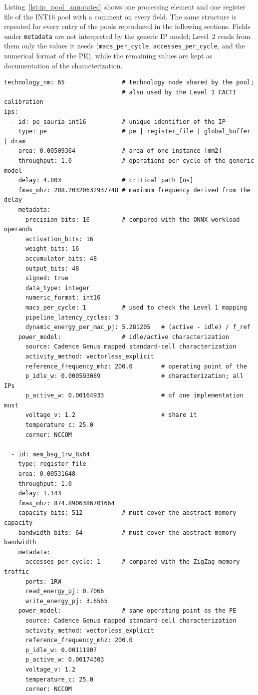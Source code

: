 Listing~\ref{lst:ip_pool_annotated} shows one processing element and
one register file of the INT16 pool with a comment on every field.
The same structure is repeated for every entry of the pools
reproduced in the following sections. Fields under
\texttt{metadata} are not interpreted by the generic IP model; Level~2
reads from them only the values it needs (\texttt{macs\_per\_cycle},
\texttt{accesses\_per\_cycle}, and the numerical format of the PE),
while the remaining values are kept as documentation of the
characterization.

\begin{lstlisting}[style=yamlpool,nolol=false,label={lst:ip_pool_annotated},caption={Annotated INT16 pool entries: one PE and one register file.}]
technology_nm: 65                # technology node shared by the pool;
                                 # also used by the Level 1 CACTI calibration
ips:
  - id: pe_sauria_int16          # unique identifier of the IP
    type: pe                     # pe | register_file | global_buffer | dram
    area: 0.00509364             # area of one instance [mm2]
    throughput: 1.0              # operations per cycle of the generic model
    delay: 4.803                 # critical path [ns]
    fmax_mhz: 208.20320632937748 # maximum frequency derived from the delay
    metadata:
      precision_bits: 16         # compared with the ONNX workload operands
      activation_bits: 16
      weight_bits: 16
      accumulator_bits: 48
      output_bits: 48
      signed: true
      data_type: integer
      numeric_format: int16
      macs_per_cycle: 1          # used to check the Level 1 mapping
      pipeline_latency_cycles: 3
      dynamic_energy_per_mac_pj: 5.281205   # (active - idle) / f_ref
    power_model:                 # idle/active characterization
      source: Cadence Genus mapped standard-cell characterization
      activity_method: vectorless_explicit
      reference_frequency_mhz: 200.0        # operating point of the
      p_idle_w: 0.000593089                 # characterization; all IPs
      p_active_w: 0.00164933                # of one implementation must
      voltage_v: 1.2                        # share it
      temperature_c: 25.0
      corner: NCCOM

  - id: mem_bsg_1rw_8x64
    type: register_file
    area: 0.00531648
    throughput: 1.0
    delay: 1.143
    fmax_mhz: 874.8906386701664
    capacity_bits: 512           # must cover the abstract memory capacity
    bandwidth_bits: 64           # must cover the abstract memory bandwidth
    metadata:
      accesses_per_cycle: 1      # compared with the ZigZag memory traffic
      ports: 1RW
      read_energy_pj: 0.7066
      write_energy_pj: 3.6565
    power_model:                 # same operating point as the PE
      source: Cadence Genus mapped standard-cell characterization
      activity_method: vectorless_explicit
      reference_frequency_mhz: 200.0
      p_idle_w: 0.00111907
      p_active_w: 0.00174303
      voltage_v: 1.2
      temperature_c: 25.0
      corner: NCCOM
\end{lstlisting}

